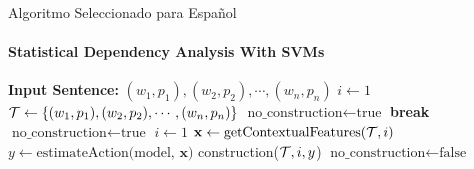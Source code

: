\documentclass{beamer}
\begin{document}
  \begin{frame}[label=alg]{Algoritmo Seleccionado para Español}
    \framesubtitle{Statistical Dependency Analysis With SVMs}
      \scriptsize
  \begin{algorithmic}[1] %
    \State \textbf{Input Sentence:} $(w_1, p_1),(w_2,p_2),\cdots,(w_n,p_n)$
    \Init
       \State $i\gets 1$
       \State ${\cal T}\gets \{(w_1, p_1),(w_2,p_2),\cdots,(w_n,p_n)\}$
       \State $\text{no\_construction}\gets \text{true}$
    \EndInit
                \textbf{break}
             \EndIf
             \State $\text{no\_construction}\gets \text{true}$
             \State $i\gets 1$
          \Else
             \State $\mathbf{x}\gets \text{getContextualFeatures(${\cal T}, i$)} $
             \State $y\gets \text{estimateAction(model, $\mathbf{x}$)}$
             \State construction(${\cal T}, i, y$)
                $\text{no\_construction}\gets \text{false}$
             \EndIf
          \EndIf
       \EndWhile
    \end{algorithmic}
  \end{frame}
\end{document}

